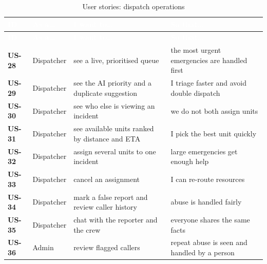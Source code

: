 {\tabfont\rowband
\begin{longtable}{@{}>{\raggedright\arraybackslash}p{}>{\raggedright\arraybackslash}p{}>{\raggedright\arraybackslash}p{}>{\raggedright\arraybackslash}p{}@{}}
\caption{User stories: dispatch operations}\label{tab:us-dsp}\\
\rowcolor{najdanavy}\textcolor{white}{\sffamily\bfseries\small ID} & \textcolor{white}{\sffamily\bfseries\small As a\ldots{}} & \textcolor{white}{\sffamily\bfseries\small I want to\ldots{}} & \textcolor{white}{\sffamily\bfseries\small So that\ldots{}}\\
\endfirsthead
\rowcolor{najdanavy}\textcolor{white}{\sffamily\bfseries\small ID} & \textcolor{white}{\sffamily\bfseries\small As a\ldots{}} & \textcolor{white}{\sffamily\bfseries\small I want to\ldots{}} & \textcolor{white}{\sffamily\bfseries\small So that\ldots{}}\\
\endhead
\bottomrule\endlastfoot
\textbf{US-28} & Dispatcher & see a live, prioritised queue & the most urgent emergencies are handled first\\
\textbf{US-29} & Dispatcher & see the AI priority and a duplicate suggestion & I triage faster and avoid double dispatch\\
\textbf{US-30} & Dispatcher & see who else is viewing an incident & we do not both assign units\\
\textbf{US-31} & Dispatcher & see available units ranked by distance and ETA & I pick the best unit quickly\\
\textbf{US-32} & Dispatcher & assign several units to one incident & large emergencies get enough help\\
\textbf{US-33} & Dispatcher & cancel an assignment & I can re-route resources\\
\textbf{US-34} & Dispatcher & mark a false report and review caller history & abuse is handled fairly\\
\textbf{US-35} & Dispatcher & chat with the reporter and the crew & everyone shares the same facts\\
\textbf{US-36} & Admin & review flagged callers & repeat abuse is seen and handled by a person\\
\end{longtable}}
